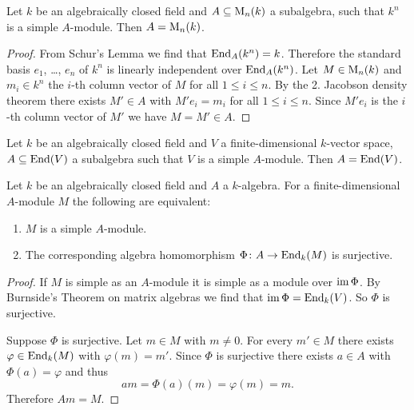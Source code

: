 \begin{cor}
 Let $k$ be an algebraically closed field and $A \subseteq \operatorname{M}_n(k)$ a subalgebra, such that $k^n$ is a simple $A$-module. Then $A = \operatorname{M}_n(k)$.
\end{cor}
\begin{proof}
 From Schur’s Lemma we find that $\operatorname{End}_A(k^n) = k$. Therefore the standard basis $e_1$, \dots, $e_n$ of $k^n$ is linearly independent over $\operatorname{End}_A(k^n)$. Let $M \in \operatorname{M}_n(k)$ and $m_i \in k^n$ the $i$-th column vector of $M$ for all $1 \leq i \leq n$. By the 2. Jacobson density theorem there exists $M' \in A$ with $M' e_i = m_i$ for all $1 \leq i \leq n$. Since $M' e_i$ is the $i$-th column vector of $M'$ we have $M = M' \in A$.
\end{proof}


\begin{cor}
 Let $k$ be an algebraically closed field and $V$ a finite-dimensional $k$-vector space, $A \subseteq \operatorname{End}(V)$ a subalgebra such that $V$ is a simple $A$-module. Then $A = \operatorname{End}(V)$.
\end{cor}


\begin{cor}\label{cor: simple algebra module surjective algebra homo}
 Let $k$ be an algebraically closed field and $A$ a  $k$-algebra. For a finite-dimensional $A$-module $M$ the following are equivalent:
 \begin{enumerate}[label=\emph{\alph*)},leftmargin=*]
  \item
   $M$ is a simple $A$-module.
  \item
   The corresponding algebra homomorphism $\Phi \colon A \to \operatorname{End}_k(M)$ is surjective.
 \end{enumerate}
\end{cor}
\begin{proof}
 If $M$ is simple as an $A$-module it is simple as a module over $\operatorname{im} \Phi$. By Burnside’s Theorem on matrix algebras we find that $\operatorname{im} \Phi = \operatorname{End}_k(V)$. So $\Phi$ is surjective.
 
 Suppose $\Phi$ is surjective. Let $m \in M$ with $m \neq 0$. For every $m' \in M$ there exists $\varphi \in \operatorname{End}_k(M)$ with $\varphi(m) = m'$. Since $\Phi$ is surjective there exists $a \in A$ with $\Phi(a) = \varphi$ and thus
 \[
  am = \Phi(a)(m) = \varphi(m) = m.
 \]
 Therefore $Am = M$.
\end{proof}


